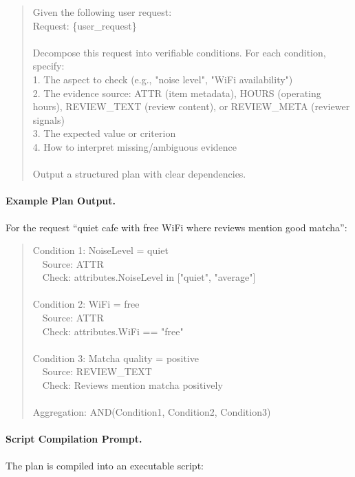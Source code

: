 \begin{quote}
\small\ttfamily
Given the following user request:\\
Request: \{user\_request\}\\
\\
Decompose this request into verifiable conditions. For each condition, specify:\\
1. The aspect to check (e.g., "noise level", "WiFi availability")\\
2. The evidence source: ATTR (item metadata), HOURS (operating hours), REVIEW\_TEXT (review content), or REVIEW\_META (reviewer signals)\\
3. The expected value or criterion\\
4. How to interpret missing/ambiguous evidence\\
\\
Output a structured plan with clear dependencies.
\end{quote}

\paragraph{Example Plan Output.}
For the request ``quiet cafe with free WiFi where reviews mention good matcha'':

\begin{quote}
\small\ttfamily
Condition 1: NoiseLevel = quiet\\
\ \ Source: ATTR\\
\ \ Check: attributes.NoiseLevel in ["quiet", "average"]\\
\\
Condition 2: WiFi = free\\
\ \ Source: ATTR\\
\ \ Check: attributes.WiFi == "free"\\
\\
Condition 3: Matcha quality = positive\\
\ \ Source: REVIEW\_TEXT\\
\ \ Check: Reviews mention matcha positively\\
\\
Aggregation: AND(Condition1, Condition2, Condition3)
\end{quote}

\paragraph{Script Compilation Prompt.}
The plan is compiled into an executable \script script:

